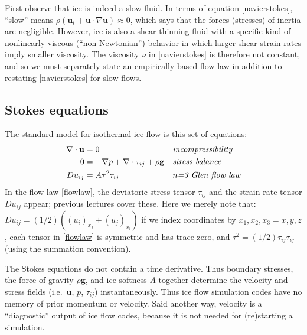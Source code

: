 \documentclass[letterpaper,final,12pt,reqno]{amsart}
\newcommand{\bu}{\mathbf{u}}
\begin{document}
First observe that ice is indeed a slow fluid.  In terms of equation \eqref{navierstokes}, ``slow'' means $\rho \left(\mathbf{u}_t + \mathbf{u}\cdot\nabla \mathbf{u}\right) \approx 0$, which says that the forces (stresses) of inertia are negligible.  However, ice is also a shear-thinning fluid with a specific kind of nonlinearly-viscous (``non-Newtonian'') behavior in which larger shear strain rates imply smaller viscosity.  The viscosity $\nu$ in \eqref{navierstokes} is therefore not constant, and so we must separately state an empirically-based flow law in addition to restating \eqref{navierstokes} for slow flows.

\subsection*{Stokes equations}  The standard model for isothermal ice flow is this set of equations:
\begin{align}
\nabla \cdot \mathbf{u} &= 0 &&\text{\emph{incompressibility}} \label{incompressibleagain} \\
0 &= - \nabla p + \nabla \cdot \tau_{ij} + \rho \mathbf{g} &&\text{\emph{stress balance}} \label{forcebalance} \\
Du_{ij} &= A \tau^2 \tau_{ij} &&\text{\emph{$n$=3 Glen flow law}} \label{flowlaw}
\end{align}
In the flow law \eqref{flowlaw}, the deviatoric stress tensor $\tau_{ij}$ and the strain rate tensor $Du_{ij}$ appear; previous lectures cover these.  Here we merely note that: $Du_{ij} = (1/2)((u_i)_{x_j}+(u_j)_{x_i})$ if we index coordinates by $x_1,x_2,x_3=x,y,z$, each tensor in \eqref{flowlaw} is symmetric and has trace zero, and $\tau^2 = (1/2) \tau_{ij} \tau_{ij}$ (using the summation convention).

The Stokes equations do not contain a time derivative.  Thus boundary stresses, the force of gravity $\rho \mathbf{g}$, and ice softness $A$ together determine the velocity and stress fields (i.e.~$\bu$, $p$, $\tau_{ij}$) instantaneously.  Thus ice flow simulation codes have no memory of prior momentum or velocity.  Said another way, velocity is a ``diagnostic'' output of ice flow codes, because it is not needed for (re)starting a simulation.
\end{document}
